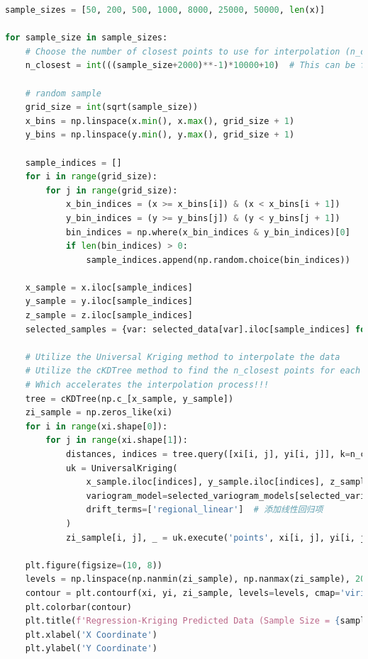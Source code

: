 \documentclass{swmcmthesis}
\begin{document}
\begin{lstlisting}[language=python,caption={The python programme for Problem 3 - Regression Kriging}]
sample_sizes = [50, 200, 500, 1000, 8000, 25000, 50000, len(x)] 

for sample_size in sample_sizes:
    # Choose the number of closest points to use for interpolation (n_closest) based on the sample size
    n_closest = int(((sample_size+2000)**-1)*10000+10)  # This can be further examined and optimized based on the data
    
    # random sample
    grid_size = int(sqrt(sample_size))
    x_bins = np.linspace(x.min(), x.max(), grid_size + 1)
    y_bins = np.linspace(y.min(), y.max(), grid_size + 1)

    sample_indices = []
    for i in range(grid_size):
        for j in range(grid_size):
            x_bin_indices = (x >= x_bins[i]) & (x < x_bins[i + 1])
            y_bin_indices = (y >= y_bins[j]) & (y < y_bins[j + 1])
            bin_indices = np.where(x_bin_indices & y_bin_indices)[0]
            if len(bin_indices) > 0:
                sample_indices.append(np.random.choice(bin_indices))

    x_sample = x.iloc[sample_indices]
    y_sample = y.iloc[sample_indices]
    z_sample = z.iloc[sample_indices]
    selected_samples = {var: selected_data[var].iloc[sample_indices] for var in selected_variables}

    # Utilize the Universal Kriging method to interpolate the data
    # Utilize the cKDTree method to find the n_closest points for each grid point.
    # Which accelerates the interpolation process!!!
    tree = cKDTree(np.c_[x_sample, y_sample])
    zi_sample = np.zeros_like(xi)
    for i in range(xi.shape[0]):
        for j in range(xi.shape[1]):
            distances, indices = tree.query([xi[i, j], yi[i, j]], k=n_closest)
            uk = UniversalKriging(
                x_sample.iloc[indices], y_sample.iloc[indices], z_sample.iloc[indices],
                variogram_model=selected_variogram_models[selected_variables[0]],  # use the variogram model of the first selected variable
                drift_terms=['regional_linear']  # 添加线性回归项
            )
            zi_sample[i, j], _ = uk.execute('points', xi[i, j], yi[i, j])

    plt.figure(figsize=(10, 8))
    levels = np.linspace(np.nanmin(zi_sample), np.nanmax(zi_sample), 20)
    contour = plt.contourf(xi, yi, zi_sample, levels=levels, cmap='viridis') 
    plt.colorbar(contour) 
    plt.title(f'Regression-Kriging Predicted Data (Sample Size = {sample_size})')
    plt.xlabel('X Coordinate')
    plt.ylabel('Y Coordinate')


\end{lstlisting}
\end{document}
